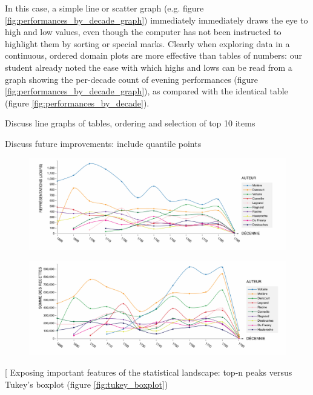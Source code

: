 \documentclass[	DIV=calc,%
							paper=a4,%
							fontsize=11pt,%
							twocolumn]{scrartcl}	 					%
\begin{document}
In this case, a simple line or scatter graph (e.g. figure \ref{fig:performances_by_decade_graph}) immediately immediately draws the eye to high and low values, even though the computer has not been instructed to highlight them by sorting or special marks.  Clearly when exploring data in a continuous, ordered domain plots are more effective than tables of numbers: our student already noted the ease with which highs and lows can be read from a graph showing the per-decade count of evening performances (figure \ref{fig:performances_by_decade_graph}), as compared with the identical table (figure \ref{fig:performances_by_decade}).



Discuss line graphs of tables, ordering and selection of top 10 items

Discuss future improvements:  include quantile points

\begin{figure}
  \centering
	\includegraphics[width=7in]{steps/top-author-performances.png}
	\caption{}
	\label{fig:top-author-performances}
\end{figure}

\begin{figure}
  \centering
	\includegraphics[width=7in]{steps/top-author-receipts.png}
	\caption{}
	\label{fig:top-author-receipts}
\end{figure}

[ Exposing important features of the statistical landscape: top-n peaks versus Tukey’s boxplot (figure \ref{fig:tukey_boxplot})
\end{document}
